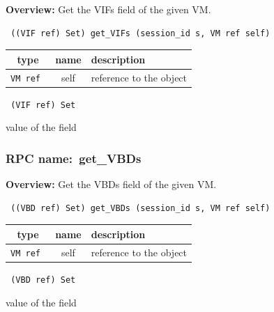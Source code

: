 {\bf Overview:} 
Get the VIFs field of the given VM.

\begin{verbatim} ((VIF ref) Set) get_VIFs (session_id s, VM ref self)\end{verbatim}



 
\vspace{0.3cm}
\begin{tabular}{|c|c|p{7cm}|}
 \hline
{\bf type} & {\bf name} & {\bf description} \\ \hline
{\tt VM ref } & self & reference to the object \\ \hline 

\end{tabular}

\vspace{0.3cm}

{\tt 
(VIF ref) Set
}


value of the field
\vspace{0.3cm}
\vspace{0.3cm}
\vspace{0.3cm}
\subsubsection{RPC name:~get\_VBDs}

{\bf Overview:} 
Get the VBDs field of the given VM.

\begin{verbatim} ((VBD ref) Set) get_VBDs (session_id s, VM ref self)\end{verbatim}



 
\vspace{0.3cm}
\begin{tabular}{|c|c|p{7cm}|}
 \hline
{\bf type} & {\bf name} & {\bf description} \\ \hline
{\tt VM ref } & self & reference to the object \\ \hline 

\end{tabular}

\vspace{0.3cm}

{\tt 
(VBD ref) Set
}


value of the field
\vspace{0.3cm}
\vspace{0.3cm}
\vspace{0.3cm}

